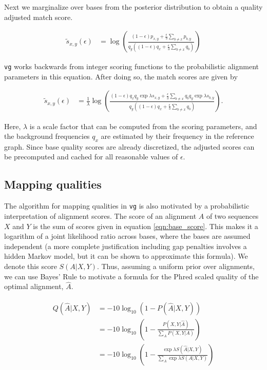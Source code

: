Next we marginalize over bases from the posterior distribution to obtain a quality adjusted match score.

\begin{align}
    \tilde s_{x,y}(\epsilon) &= \log\left(\frac{(1 - \epsilon)p_{x,y} + \frac{\epsilon}{3}\sum_{b \neq x}p_{b, y}}{q_y\left((1 - \epsilon)q_x + \frac{\epsilon}{3}\sum_{b \neq x}q_b \right)} \right)
\end{align}

{\tt vg} works backwards from integer scoring functions to the probabilistic alignment parameters in this equation. After doing so, the match scores are given by

\begin{align}
    \tilde s_{x,y}(\epsilon) &= \frac{1}{\lambda} \log\left(\frac{(1 - \epsilon)q_x q_y \exp \lambda s_{x,y} + \frac{\epsilon}{3}\sum_{b \neq x}q_b q_y \exp \lambda s_{b,y}}{q_y\left((1 - \epsilon)q_x + \frac{\epsilon}{3}\sum_{b \neq x}q_b \right)} \right).
\end{align}

Here, $\lambda$ is a scale factor that can be computed from the scoring parameters, and the background frequencies $q_x$ are estimated by their frequency in the reference graph. Since base quality scores are already discretized, the adjusted scores can be precomputed and cached for all reasonable values of $\epsilon$. 

\subsection{Mapping qualities}

The algorithm for mapping qualities in {\tt vg} is also motivated by a probabilistic interpretation of alignment scores.
The score of an alignment $A$ of two sequences $X$ and $Y$ is the sum of scores given in equation \ref{eqn:base_score}.
This makes it a logarithm of a joint likelihood ratio across bases, where the bases are assumed independent (a more complete justification including gap penalties involves a hidden Markov model, but it can be shown to approximate this formula).
We denote this score $S(A|X,Y)$.
Thus, assuming a uniform prior over alignments, we can use Bayes' Rule to motivate a formula for the Phred scaled quality of the optimal alignment, $\hat A$.

\begin{align}
\begin{split}
    Q(\hat A|X,Y) &= -10\log_{10}(1 - P(\hat A|X,Y)) \\
    &= -10 \log_{10}\left(1 - \frac{P(X,Y|\hat A)}{\sum_{A}P(X,Y|A)} \right) \\
    &= -10 \log_{10}\left(1 - \frac{\exp \lambda S(\hat A|X,Y)}{\sum_{A}\exp \lambda S(A|X,Y)} \right) \label{basicqualityscore}
\end{split}
\end{align}

